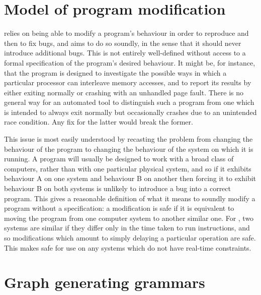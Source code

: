 \section{Model of program modification}
\label{sect:intro:theory_of_fixing}

{\Technique} relies on being able to modify a program's behaviour in
order to reproduce and then to fix bugs, and aims to do so soundly, in
the sense that it should never introduce additional bugs.  This is not
entirely well-defined without access to a formal specification of the
program's desired behaviour.  It might be, for instance, that the
program is designed to investigate the possible ways in which a
particular processor can interleave memory accesses, and to report its
results by either exiting normally or crashing with an unhandled page
fault.  There is no general way for an automated tool to distinguish
such a program from one which is intended to always exit normally but
occasionally crashes due to an unintended race condition.  Any fix for
the latter would break the former.

This issue is most easily understood by recasting the problem from
changing the behaviour of the program to changing the behaviour of the
system on which it is running.  A program will usually be designed to
work with a broad class of computers, rather than with one particular
physical system, and so if it exhibits behaviour A on one system and
behaviour B on another then forcing it to exhibit behaviour B on both
systems is unlikely to introduce a bug into a correct program.  This
gives a reasonable definition of what it means to soundly modify a
program without a specification: a modification is safe if it is
equivalent to moving the program from one computer system to another
similar one.  For {\technique}, two systems are similar if they differ
only in the time taken to run instructions, and so modifications which
amount to simply delaying a particular operation are safe.  This makes
{\technique} safe for use on any systems which do not have real-time
constraints.

\section{Graph generating grammars}
\label{sect:intro:graph_grammar}

